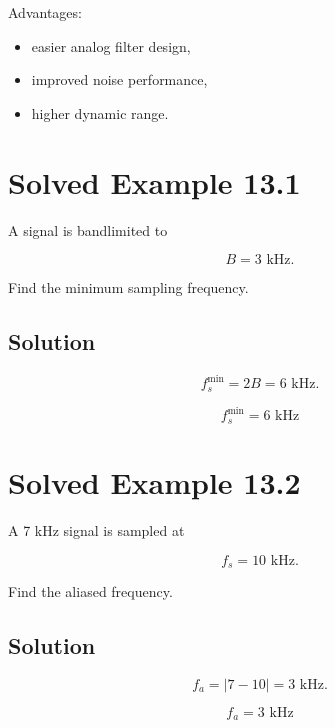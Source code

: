 Advantages:

\begin{itemize}
\item easier analog filter design,
\item improved noise performance,
\item higher dynamic range.
\end{itemize}


\section{Solved Example 13.1}

A signal is bandlimited to

\[
B=3\text{ kHz}.
\]

Find the minimum sampling frequency.


\subsection{Solution}

\[
f_s^{\min}=2B=6\text{ kHz}.
\]

\[
\boxed{
f_s^{\min}=6\text{ kHz}
}
\]


\section{Solved Example 13.2}

A 7 kHz signal is sampled at

\[
f_s=10\text{ kHz}.
\]

Find the aliased frequency.


\subsection{Solution}

\[
f_a=|7-10|=3\text{ kHz}.
\]

\[
\boxed{
f_a=3\text{ kHz}
}
\]


